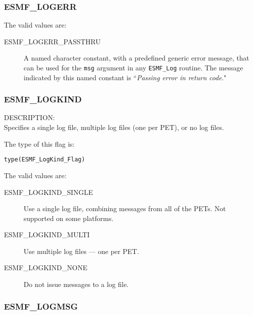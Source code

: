 

\subsubsection{ESMF\_LOGERR}
\label{const:logerr}

The valid values are:
\begin{description}
	\item [ESMF\_LOGERR\_PASSTHRU]
		A named character constant, with a predefined generic error message, 
		that can be used for the {\tt msg} argument in any {\tt ESMF\_Log} 
		routine.  The message indicated 
		by this named constant is ``{\it Passing error in return code}."
\end{description}

\subsubsection{ESMF\_LOGKIND}
\label{const:logkindflag}

{\sf DESCRIPTION:\\}
Specifies a single log file, multiple log files (one per PET), or no log files.

The type of this flag is:

{\tt type(ESMF\_LogKind\_Flag)}

The valid values are:
\begin{description}
   \item [ESMF\_LOGKIND\_SINGLE] 
         Use a single log file, combining messages from all of the PETs.  Not supported on some platforms.
   \item [ESMF\_LOGKIND\_MULTI]
         Use multiple log files --- one per PET.
   \item [ESMF\_LOGKIND\_NONE]
         Do not issue messages to a log file.
\end{description}

\subsubsection{ESMF\_LOGMSG}
\label{const:logmsgflag}

